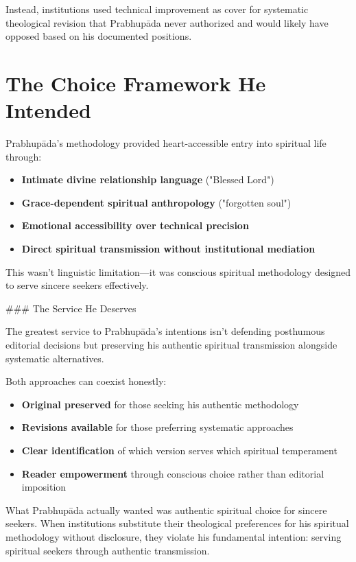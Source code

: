 \documentclass[11pt,twoside]{book}
\begin{document}
Instead, institutions used technical improvement as cover for systematic theological revision that Prabhupāda never authorized and would likely have opposed based on his documented positions.
\section*{The Choice Framework He Intended}
\label{sec:org13dbe40}

Prabhupāda's methodology provided heart-accessible entry into spiritual life through:
\begin{itemize}
\item \textbf{\textbf{Intimate divine relationship language}} ("Blessed Lord")
\item \textbf{\textbf{Grace-dependent spiritual anthropology}} ("forgotten soul")
\item \textbf{\textbf{Emotional accessibility over technical precision}}
\item \textbf{\textbf{Direct spiritual transmission without institutional mediation}}
\end{itemize}

This wasn't linguistic limitation—it was conscious spiritual methodology designed to serve sincere seekers effectively.

\#\#\# The Service He Deserves

The greatest service to Prabhupāda's intentions isn't defending posthumous editorial decisions but preserving his authentic spiritual transmission alongside systematic alternatives.

Both approaches can coexist honestly:
\begin{itemize}
\item \textbf{\textbf{Original preserved}} for those seeking his authentic methodology
\item \textbf{\textbf{Revisions available}} for those preferring systematic approaches
\item \textbf{\textbf{Clear identification}} of which version serves which spiritual temperament
\item \textbf{\textbf{Reader empowerment}} through conscious choice rather than editorial imposition
\end{itemize}

What Prabhupāda actually wanted was authentic spiritual choice for sincere seekers. When institutions substitute their theological preferences for his spiritual methodology without disclosure, they violate his fundamental intention: serving spiritual seekers through authentic transmission.
\end{document}
